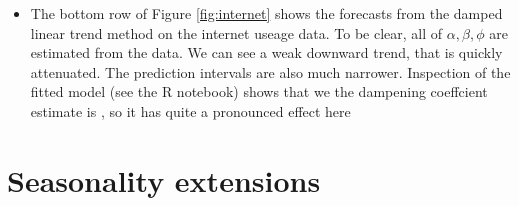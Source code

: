 \documentclass{article}
\begin{document}
\begin{itemize}
\item The bottom row of Figure \ref{fig:internet} shows the forecasts from the
  damped linear trend method on the internet useage data. To be clear, all of 
  $\alpha,\beta,\phi$ are estimated from the data. We can see a weak downward
  trend, that is quickly attenuated. The prediction intervals are also much 
  narrower. Inspection of the fitted model (see the R notebook) shows that we
  the dampening coeffcient estimate is , so it has
  quite a pronounced effect here
\end{itemize}

\section{Seasonality extensions}
\end{document}
